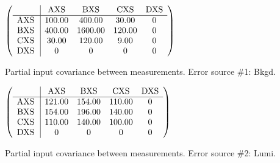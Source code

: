 \begin{table}[H]
\scriptsize
\begin{center}
\renewcommand{\arraystretch}{1.1}
\begin{math}\left(\begin{array}{c|cccc}
 & \mathrm{AXS} & 
\mathrm{BXS} & 
\mathrm{CXS} & 
\mathrm{DXS} \\
\hline
\mathrm{AXS} \hspace*{2pt} &     100.00 &     400.00 &      30.00 &  0 \\
\mathrm{BXS} \hspace*{2pt} &     400.00 &    1600.00 &     120.00 &  0 \\
\mathrm{CXS} \hspace*{2pt} &      30.00 &     120.00 &       9.00 &  0 \\
\mathrm{DXS} \hspace*{2pt} &  0 &  0 &  0 &  0 \\
\end{array}\right)\end{math}
\caption{Partial input covariance between measurements. Error source \#1: Bkgd.}
\renewcommand{\arraystretch}{1}
\end{center}
\end{table}
\begin{table}[H]
\scriptsize
\begin{center}
\renewcommand{\arraystretch}{1.1}
\begin{math}\left(\begin{array}{c|cccc}
 & \mathrm{AXS} & 
\mathrm{BXS} & 
\mathrm{CXS} & 
\mathrm{DXS} \\
\hline
\mathrm{AXS} \hspace*{2pt} &     121.00 &     154.00 &     110.00 &  0 \\
\mathrm{BXS} \hspace*{2pt} &     154.00 &     196.00 &     140.00 &  0 \\
\mathrm{CXS} \hspace*{2pt} &     110.00 &     140.00 &     100.00 &  0 \\
\mathrm{DXS} \hspace*{2pt} &  0 &  0 &  0 &  0 \\
\end{array}\right)\end{math}
\caption{Partial input covariance between measurements. Error source \#2: Lumi.}
\renewcommand{\arraystretch}{1}
\end{center}
\end{table}
\clearpage
